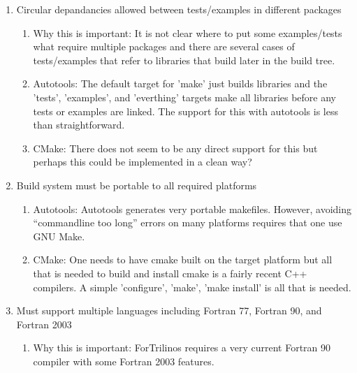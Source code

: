 \documentclass[pdf,ps2pdf,11pt]{SANDreport}
\begin{document}
\begin{enumerate}
\begin{enumerate}
\begin{enumerate}
    \end{enumerate}

  {}\item Circular depandancies allowed between tests/examples in
  different packages

    \begin{enumerate}

    {}\item Why this is important: It is not clear where to put some
    examples/tests what require multiple packages and there are
    several cases of tests/examples that refer to libraries that build
    later in the build tree.

    {}\item Autotools: The default target for 'make' just builds
    libraries and the 'tests', 'examples', and 'everthing' targets
    make all libraries before any tests or examples are linked.  The
    support for this with autotools is less than straightforward.

    {}\item CMake: There does not seem to be any direct support for
    this but perhaps this could be implemented in a clean way?

    \end{enumerate}

  {}\item Build system must be portable to all required platforms

    \begin{enumerate}

    {}\item Autotools: Autotools generates very portable makefiles.
    However, avoiding ``commandline too long'' errors on many
    platforms requires that one use GNU Make.

    {}\item CMake: One needs to have cmake built on the target
    platform but all that is needed to build and install cmake is a
    fairly recent C++ compilers.  A simple 'configure', 'make',
    'make install' is all that is needed.

    \end{enumerate}

  {}\item Must support multiple languages including Fortran 77,
  Fortran 90, and Fortran 2003

    \begin{enumerate}

    {}\item Why this is important: ForTrilinos requires a very current
    Fortran 90 compiler with some Fortran 2003 features.


\end{enumerate}
\end{enumerate}
\end{enumerate}
\end{document}
